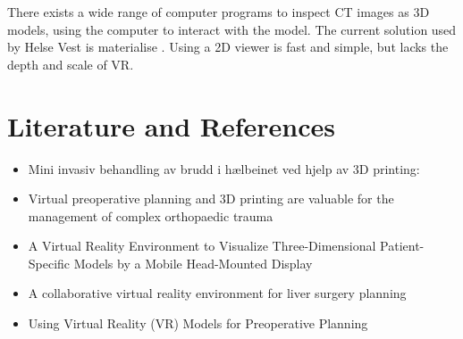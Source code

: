 \documentclass[11pt]{scrartcl}
\begin{document}
There exists a wide range of computer programs to inspect CT images as 3D models, using the computer to interact with the model.
The current solution used by Helse Vest is materialise \cite{materialise}. Using a 2D viewer is fast and simple, but lacks the depth and scale of VR.


\section{Literature and References}

\begin{itemize}
\item Mini invasiv behandling av brudd i hælbeinet ved hjelp av 3D printing:


\item Virtual preoperative planning and 3D printing are valuable for the management of complex orthopaedic trauma


\item A Virtual Reality Environment to Visualize Three-Dimensional Patient-Specific Models by a Mobile Head-Mounted Display


\item A collaborative virtual reality environment for liver surgery planning

\item Using Virtual Reality (VR) Models for Preoperative Planning
\end{itemize}
\end{document}
